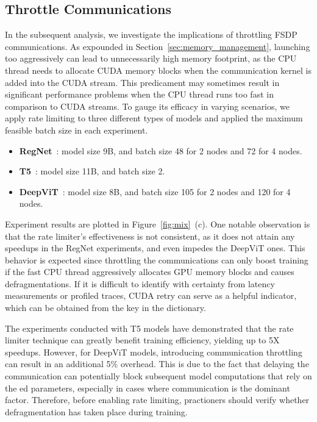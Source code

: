 \subsection{Throttle Communications}\label{sec:eval_rate_limiting}

In the subsequent analysis, we investigate the implications of throttling FSDP communications. As expounded in Section~\ref{sec:memory_management}, launching  too aggressively can lead to unnecessarily high memory footprint, as the CPU thread needs to allocate CUDA memory blocks when the communication kernel is added into the CUDA stream. This predicament may sometimes result in significant performance problems when the CPU thread runs too fast in comparison to CUDA streams. To gauge its efficacy in varying scenarios, we apply rate limiting to three different types of models and applied the maximum feasible batch size in each experiment.

\begin{itemize}
    \item \textbf{RegNet}~\cite{schneider2017regnet}: model size 9B, and batch size 48 for 2 nodes and 72 for 4 nodes.
    \item \textbf{T5}~\cite{raffel2020exploring}: model size 11B, and batch size 2. 
    \item \textbf{DeepViT}~\cite{zhou2021deepvit}: model size 8B, and batch size 105 for 2 nodes and 120 for 4 nodes. 
\end{itemize}



Experiment results are plotted in Figure~\ref{fig:mix}~(c).  One notable observation is that the rate limiter's effectiveness is not consistent, as it does not attain any speedups in the RegNet experiments, and even impedes the DeepViT ones. This behavior is expected since throttling the communications can only boost training if the fast CPU thread aggressively allocates GPU memory blocks and causes defragmentations. If it is difficult to identify with certainty from latency measurements or profiled traces, CUDA  retry can serve as a helpful indicator, which can be obtained from the  key in the  dictionary.

The experiments conducted with T5 models have demonstrated that the rate limiter technique can greatly benefit training efficiency, yielding up to 5X speedups. However, for DeepViT models, introducing communication throttling can result in an additional 5\% overhead. This is due to the fact that delaying the  communication can potentially block subsequent model computations that rely on the ed parameters, especially in cases where communication is the dominant factor. Therefore, before enabling rate limiting, practioners should verify whether defragmentation has taken place during training.  

